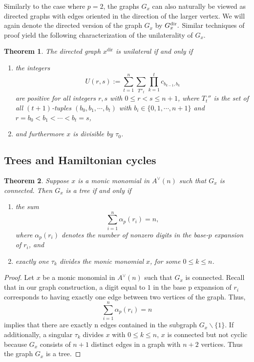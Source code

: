 \documentclass{amsart}
\newtheorem{theorem}{Theorem}[section]
\theoremstyle{definition}
\theoremstyle{plain}
\numberwithin{theorem}{section}
\numberwithin{equation}{section}
\numberwithin{figure}{section}
\newcommand{\0}{\langle 0 \rangle }
\begin{document}
Similarly to the case where $p = 2$, the graphs $G_x$ can also naturally be viewed as directed graphs with edges oriented in the direction of the larger vertex. We will again denote the directed version of the graph $G_x$ by $G^\textup{dir}_x.$ Similar techniques of proof yield the following characterization of the unilaterality of $G_x$.

\begin{theorem} \label{thm:unilateralOdd}
    The directed graph $x^{\text{dir}}$ is unilateral if and only if 
    \begin{enumerate}
        \item the integers
        \[
        U(r,s) := \sum_{t=1}^{n}\sum_{{T}''_t}\prod_{k=1}^t c_{b_{k-1},b_k}
        \]
        are positive for all integers $r,s$ with $0 \leq r < s \leq n + 1$, where ${T}_t''$ is the set of all $(t + 1)$-tuples $(b_0, b_1, \cdots, b_t)$ with $b_i \in \{0, 1, \cdots, n + 1\}$ and $r = b_0 < b_1 < \cdots < b_t = s$,
        \item and furthermore $x$ is divisible by $\tau_0$.
    \end{enumerate}
\end{theorem}

\subsection{Trees and Hamiltonian cycles} \label{sec:Trees&HamiltonOdd}

\begin{theorem} \label{thm:treesOdd}
    Suppose $x$ is a monic monomial in $A^\vee(n)$ such that $G_x$ is connected. Then $G_x$ is a tree if and only if
   \begin{enumerate}
       \item the sum \[
            \sum_{i=1}^{n} \alpha_p(r_i) = n,
            \]
            where \( \alpha_p(r_i) \) denotes the number of nonzero digits in the base-\(p\) expansion of \( r_i \), and
            \item exactly one \( \tau_k \) divides the monic monomial \( x \), for some \( 0 \leq k \leq n \).
   \end{enumerate}
\end{theorem}

\begin{proof}
Let $x$ be a monic monomial in $A^\vee(n)$ such that $G_x$ is connected. Recall that in our graph construction, a digit equal to $1$ in the base p expansion of $r_i$ corresponds to having exactly one edge between two vertices of the graph. Thus, \[
\sum_{i=1}^{n} \alpha_p(r_i) = n
\] implies that there are exactly n edges contained in the subgraph $G_x \backslash \{1 \}$. If additionally, a singular \( \tau_k \) divides $x$ with \( 0 \leq k \leq n \), $x$ is connected but not cyclic because $G_x$ consists of $n+1$ distinct edges in a graph with $n+2$ vertices. Thus the graph $G_x$ is a tree. 
\end{proof}
\end{document}
